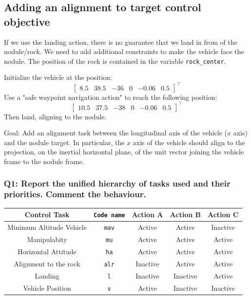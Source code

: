\documentclass{article}
\begin{document}
\subsection{Adding an alignment to target control objective}
If we use the landing action, there is no guarantee that we land in from of the nodule/rock. We need to add additional constraints to make the vehicle face the nodule. The position of the rock is contained in the variable \texttt{rock\_center}. 

Initialize the vehicle at the position:
\begin{displaymath}
\begin{bmatrix} 8.5 & 38.5 & -36 & 0 & -0.06 & 0.5 \end{bmatrix}^\top
\end{displaymath} 
Use a "safe waypoint navigation action" to reach the following position: 
\begin{displaymath}
\begin{bmatrix} 10.5 & 37.5 & -38 & 0 & -0.06 & 0.5 \end{bmatrix}^\top
\end{displaymath} 
Then land, aligning to the nodule.

Goal: Add an alignment task between the longitudinal axis of the vehicle ($x$ axis) and the nodule target. In particular, the $x$ axis of the vehicle should align to the projection, on the inertial horizontal plane, of the unit vector joining the vehicle frame to the nodule frame.

\subsubsection{Q1: Report the unified hierarchy of tasks used and their priorities. Comment the behaviour.}

\begin{center}
\begin{tabular}{ | c | c | c | c | c |}
\hline
 Control Task & \texttt{Code name} & Action A & Action B & Action C\\
 \hline
 Minimum Altitude Vehicle &  \texttt{mav} & Active & Active & Inactive\\  
 Manipulabity &  \texttt{mu} & Active & Active & Active\\
 Horizontal Attitude &  \texttt{ha} & Active & Active & Active\\
 Alignment to the rock & \texttt{alr} & Inactive & Active & Active \\
 Landing & \texttt{l} &Inactive & Inactive & Active \\
 Vehicle Position &  \texttt{v} &Active & Inactive & Inactive\\
 \hline
\end{tabular}
\end{center}
\end{document}
